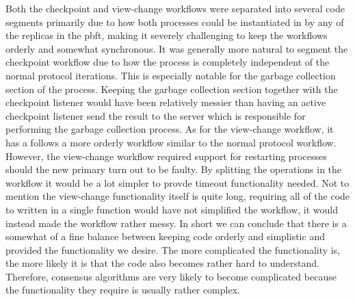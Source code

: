 Both the checkpoint and view-change workflows were separated into several code segments primarily due to how both processes could be instantiated in by any of the replicas in the \ac{pbft}, making it severely challenging to keep the workflows orderly and somewhat synchronous. It was generally more natural to segment the checkpoint workflow due to how the process is completely independent of the normal protocol iterations. This is especially notable for the garbage collection section of the process. Keeping the garbage collection section together with the checkpoint listener would have been relatively messier than having an active checkpoint listener send the result to the server which is responsible for performing the garbage collection process. As for the view-change workflow, it has a follows a more orderly workflow similar to the normal protocol workflow. However, the view-change workflow required support for restarting processes should the new primary turn out to be faulty. By splitting the operations in the workflow it would be a lot simpler to provde timeout functionality needed. Not to mention the view-change functionality itself is quite long, requiring all of the code to written in a single function would have not simplified the workflow, it would instead made the workflow rather messy. In short we can conclude that there is a somewhat of a fine balance between keeping code orderly and simplistic and provided the functionality we desire. The more complicated the functionality is, the more likely it is that the code also becomes rather hard to understand. Therefore, consensus algorithms are very likely to become complicated because the functionality they require is usually rather complex.
